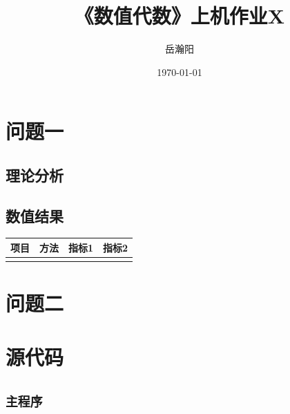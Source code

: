 \documentclass[10pt, a4paper]{article}
\title{\textbf{《数值代数》上机作业X}}
\author{岳瀚阳\quad\quad\quad\quad 3230104443}
\date{\today}
\begin{document}
\maketitle

\section{问题一}



\subsection{理论分析}



\subsection{数值结果}

\begin{table}[H]
    \centering
    \begin{tabular}{llcc}
        \toprule
        项目 & 方法 & 指标1 & 指标2 \\
        \midrule
         &  &  &  \\
        \bottomrule
    \end{tabular}
\end{table}

\section{问题二}



\appendix
\section{源代码}

\subsection{\texttt{主程序}}
% 
\end{document}
